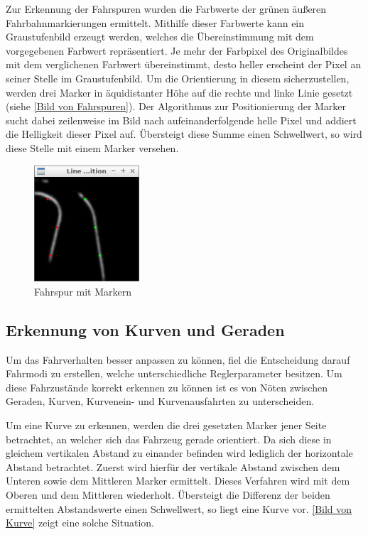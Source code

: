 Zur Erkennung der Fahrspuren wurden die Farbwerte der grünen äußeren Fahrbahnmarkierungen ermittelt. Mithilfe dieser Farbwerte kann ein Graustufenbild erzeugt werden, welches die Übereinstimmung mit dem vorgegebenen Farbwert repräsentiert. Je mehr der Farbpixel des Originalbildes mit dem verglichenen Farbwert übereinstimmt, desto heller erscheint der Pixel an seiner Stelle im Graustufenbild. Um die Orientierung in diesem sicherzustellen, werden drei Marker in äquidistanter Höhe auf die rechte und linke Linie gesetzt (siehe \autoref{Bild von Fahrspuren}). Der Algorithmus zur Positionierung der Marker sucht dabei zeilenweise im Bild nach aufeinanderfolgende helle Pixel und addiert die Helligkeit dieser Pixel auf. Übersteigt diese Summe einen Schwellwert, so wird diese Stelle mit einem Marker versehen.

\begin{figure}[ht]
	\centering
	\includegraphics[width=0.35\textwidth]{images/isnt_straight_original.png}
	\caption{Fahrspur mit Markern}
\end{figure}
\label{Bild von Fahrspuren}

\subsection{Erkennung von Kurven und Geraden}
\label{sec:kurvenerkennung}
Um das Fahrverhalten besser anpassen zu können, fiel die Entscheidung darauf Fahrmodi zu erstellen, welche unterschiedliche Reglerparameter besitzen. Um diese Fahrzustände korrekt erkennen zu können ist es von Nöten zwischen Geraden, Kurven, Kurvenein- und Kurvenausfahrten zu unterscheiden.

Um eine Kurve zu erkennen, werden die drei gesetzten Marker jener Seite betrachtet, an welcher sich das Fahrzeug gerade orientiert. Da sich diese in gleichem vertikalen Abstand zu einander befinden wird lediglich der horizontale Abstand betrachtet. Zuerst wird hierfür der vertikale Abstand zwischen dem Unteren sowie dem Mittleren Marker ermittelt. Dieses Verfahren wird mit dem Oberen und dem Mittleren wiederholt. Übersteigt die Differenz der beiden ermittelten Abstandswerte einen Schwellwert, so liegt eine Kurve vor. \autoref{Bild von Kurve} zeigt eine solche Situation.

